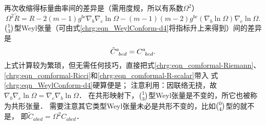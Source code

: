 再次收缩得标量曲率间的差异是（需用度规，所以有系数$\Omega^2$）
\begin{equation}\label{chrg:eqn_comformal-R-scalar}
   \Omega^2\tilde{R}= R -2(m-1) g^{bc} {\nabla}_{b}  {\nabla}_c \ln \Omega
        -(m-1)(m-2)  {g}^{bc}({\nabla}_b \ln\Omega){\nabla}_c \ln\Omega .
\end{equation}
$\binom{1}{3}$型Weyl张量（可由式\eqref{chrg:eqn_WeylConform-d4}将指标升上来得到）间的差异是
\begin{equation}\label{chrg:eqn_comformal-Weyl}
    \tilde{C}_{\hphantom{a} bcd}^a = C_{\hphantom{a} bcd}^a .
\end{equation}
上式计算较为繁琐，但无需任何技巧，直接把式\eqref{chrg:eqn_comformal-Riemann}、
\eqref{chrg:eqn_comformal-Ricci}和\eqref{chrg:eqn_comformal-R-scalar}带入
式\eqref{chrg:eqn_WeylConform-d4}硬算便是；
注意利用：因联络无挠，故$\nabla_b \nabla_c \ln \Omega =\nabla_c \nabla_b \ln \Omega$．
在共形映射下，$\binom{1}{3}$型Weyl张量是不变的，所它也被称为{\heiti 共形张量}．
需要注意其它类型Weyl张量未必是共形不变的，比如$\binom{0}{4}$型的就不是，
即$\tilde{C}_{abcd} =\Omega^2 C_{abcd}$．
